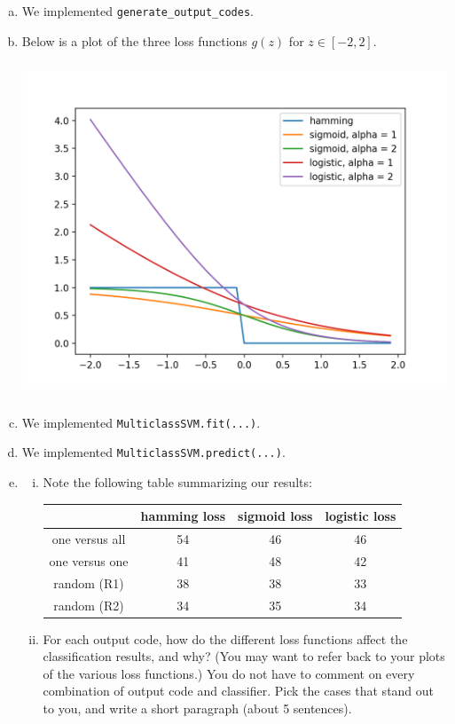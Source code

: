\documentclass[11pt]{article}
\begin{document}
\begin{enumerate}[(a)]
	\item We implemented \verb+generate_output_codes+.
	\item Below is a plot of the three loss functions $g(z)$ for $z \in [-2, 2]$. 
\begin{center}
\includegraphics[width = 15cm, height = 10cm]{loss_funcs.png}
\end{center}
	\item We implemented \verb+MulticlassSVM.fit(...)+.
	\item We implemented \verb+MulticlassSVM.predict(...)+.
	\item 
\begin{enumerate}[i.]
	\item Note the following table summarizing our results:
\begin{center}
\begin{tabular}{  c | c | c | c | } 
& hamming loss & sigmoid loss & logistic loss \\
\hline
one versus all & 54 & 46 & 46\\ 
\hline
one versus one & 41 & 48 & 42\\ 
\hline
random (R1) & 38 & 38 & 33\\ 
\hline
random (R2) & 34 & 35 & 34\\ 
\hline
\end{tabular}
\end{center}


	\item For each output code, how do the different loss functions affect the classification results, and why? (You may want to refer back to your plots of the various loss functions.) You do not have to comment on every combination of output code and classifier. Pick the cases that stand out to you, and write a short paragraph (about 5 sentences). \\


\end{enumerate}
\end{enumerate}
\end{document}

